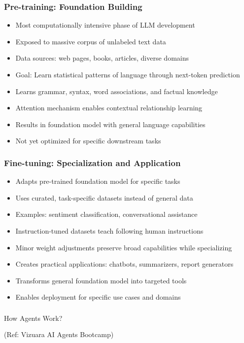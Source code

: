 \begin{frame}[fragile]\frametitle{Pre-training: Foundation Building}
      \begin{itemize}
	  \item Most computationally intensive phase of LLM development
	  \item Exposed to massive corpus of unlabeled text data
	  \item Data sources: web pages, books, articles, diverse domains
	  \item Goal: Learn statistical patterns of language through next-token prediction
	  \item Learns grammar, syntax, word associations, and factual knowledge
	  \item Attention mechanism enables contextual relationship learning
	  \item Results in foundation model with general language capabilities
	  \item Not yet optimized for specific downstream tasks
	  \end{itemize}
\end{frame}

\begin{frame}[fragile]\frametitle{Fine-tuning: Specialization and Application}
      \begin{itemize}
	  \item Adapts pre-trained foundation model for specific tasks
	  \item Uses curated, task-specific datasets instead of general data
	  \item Examples: sentiment classification, conversational assistance
	  \item Instruction-tuned datasets teach following human instructions
	  \item Minor weight adjustments preserve broad capabilities while specializing
	  \item Creates practical applications: chatbots, summarizers, report generators
	  \item Transforms general foundation model into targeted tools
	  \item Enables deployment for specific use cases and domains
	  \end{itemize}
\end{frame}

\begin{frame}[fragile]\frametitle{}
\begin{center}
{\Large How Agents Work?}

{\tiny (Ref: Vizuara AI Agents Bootcamp)}
\end{center}
\end{frame}

